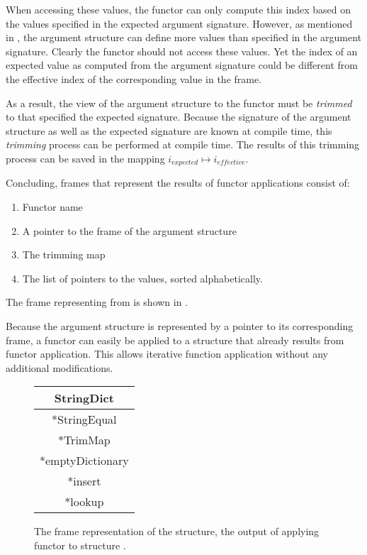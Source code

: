 \documentclass[10pt,a4paper,master=cws, masteroption=ai,english,inputenc=utf8]{kulemt}
\begin{document}
When accessing these values, the functor can only compute this index based on the values specified in the expected argument signature.
However, as mentioned in , the argument structure can define more values than specified in the argument signature.
Clearly the functor should not access these values.
Yet the index of an expected value as computed from the argument signature could be different from the effective index of the corresponding value in the frame.

As a result, the view of the argument structure to the functor must be \emph{trimmed} to that specified the expected signature. 
Because the signature of the argument structure as well as the expected signature are known at compile time, this \emph{trimming} process can be performed at compile time.
The results of this trimming process can be saved in the mapping $i_{\mathit{expected}} \mapsto i_{\mathit{effective}}$.

Concluding, frames that represent the results of functor applications consist of:
\begin{enumerate}
\item Functor name
\item A pointer to the frame of the argument structure
\item The trimming map
\item The list of pointers to the values, sorted alphabetically.
\end{enumerate}
The frame representing  from  is shown in .

Because the argument structure is represented by a pointer to its corresponding frame, a functor can easily be applied to a structure that already results from functor application.
This allows iterative function application without any additional modifications.

\begin{figure}[htb]
\centering
\begin{tabular}{|c|}
\hline
StringDict \\
\hline
*StringEqual\\
*TrimMap\\
\hline
*emptyDictionary \\
*insert \\ 
*lookup \\
\hline
\end{tabular}
\caption{The frame representation of the  structure, the output of applying functor  to structure .\label{fig:StringDictFrame}}
\end{figure}
\end{document}
